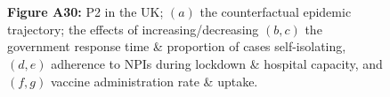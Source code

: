 \documentclass[paper=a4,fontsize=11pt]{article}
\begin{document}
\begin{figure}[!h]
  \\
  \hspace{1.76cm}
  \\
  \caption*{\textbf{Figure A30:} P2 in the UK; $(a)$ the counterfactual epidemic trajectory; the effects of increasing/decreasing $(b,c)$ the government response time \& proportion of cases self-isolating, $(d,e)$ adherence to NPIs during lockdown \& hospital capacity, and $(f,g)$ vaccine administration rate \& uptake.}
\end{figure}
\end{document}
